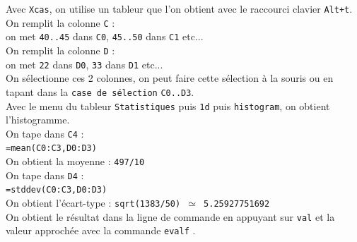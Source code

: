 \documentclass[a4paper,11pt]{book}
\begin{document}
\begin{itemize}
Avec {\tt Xcas}, on utilise un tableur que l'on obtient avec le raccourci clavier {\tt Alt+t}.\\
On remplit la colonne {\tt C} :\\
on met {\tt 40..45} dans {\tt C0}, {\tt 45..50} dans {\tt C1} etc...\\
On remplit la colonne {\tt D} :\\
on met {\tt 22} dans {\tt D0}, {\tt 33} dans {\tt D1} etc...\\
On s\'electionne ces 2 colonnes, on peut faire cette s\'election \`a la souris 
ou en tapant dans la {\tt case de s\'election} {\tt C0..D3}.\\
Avec le menu du tableur {\tt Statistiques} puis {\tt 1d} puis {\tt histogram}, 
on obtient l'histogramme.\\
On tape dans {\tt C4} :\\
{\tt =mean(C0:C3,D0:D3)}\\
On obtient la moyenne :
{\tt 497/10}\\
On tape dans {\tt D4} :\\
{\tt =stddev(C0:C3,D0:D3)}\\
On obtient l'\'ecart-type :
{\tt sqrt(1383/50)  $\simeq$ 5.25927751692}\\
On obtient le r\'esultat dans la ligne de commande en appuyant sur {\tt val} 
et la valeur approch\'ee avec la commande {\tt evalf} .
\end{itemize}
\end{document}
